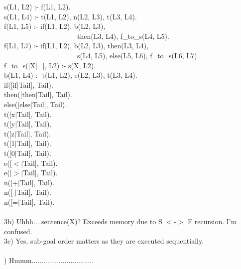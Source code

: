 \documentclass[12pt]{article}
\begin{document}
\noindent s(L1, L2) :- f(L1, L2).\\
s(L1, L4) :- t(L1, L2), n(L2, L3), t(L3, L4).\\

\noindent f(L1, L5) :- if(L1, L2), b(L2, L3), \\
\ \ \ \ \ \ \ \ \ \ \ \ \ \ \ \ \ \ \ \ \ then(L3, L4), f\_to\_s(L4, L5).\\
\noindent f(L1, L7) :- if(L1, L2), b(L2, L3), then(L3, L4), \\
\ \ \ \ \ \ \ \ \ \ \ \ \ \ \ \ \ \ \ \ \ s(L4, L5), else(L5, L6), f\_to\_s(L6, L7).\\

\noindent f\_to\_s([X$|$\_], L2) :- s(X, L2).\\

\noindent b(L1, L4) :- t(L1, L2), e(L2, L3), t(L3, L4).\\

\noindent if([if$|$Tail], Tail).\\
then([then$|$Tail], Tail).\\
else([else$|$Tail], Tail).\\

\noindent t([x$|$Tail], Tail).\\
t([y$|$Tail], Tail).\\
t([z$|$Tail], Tail).\\
t([1$|$Tail], Tail).\\
t([0$|$Tail], Tail).\\

\noindent e([$<$$|$Tail], Tail).\\
e([$>$$|$Tail], Tail).\\

\noindent n([+$|$Tail], Tail).\\
n([-$|$Tail], Tail).\\
n([=$|$Tail], Tail).\\\\


\noindent 3b) Uhhh... sentence(X)? Exceeds memory due to S $<$-$>$ F recursion. I'm confused.\\

\noindent 3c) Yes, sub-goal order matters as they are executed sequentially.\\


\hrulefill \\


) Hmmm................................
\end{document}
